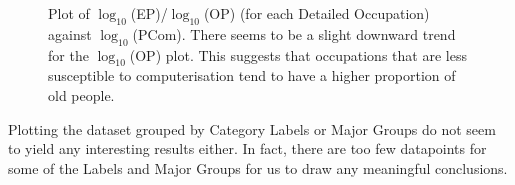 \documentclass[11pt]{article}
\begin{document}
\begin{figure}[!htb]
	\centering
	\hfill
	\hfill
	\caption{Plot of $\log_{10}$(EP)/$\log_{10}$(OP) (for each Detailed Occupation) against $\log_{10}$(PCom). There seems to be a slight downward trend for the $\log_{10}$(OP) plot. This suggests that occupations that are less susceptible to computerisation tend to have a higher proportion of old people.}
	\label{fig:logEP/OP against PCom}
\end{figure}


Plotting the dataset grouped by Category Labels or Major Groups do not seem to yield any interesting results either. In fact, there are too few datapoints for some of the Labels and Major Groups for us to draw any meaningful conclusions.
\end{document}
